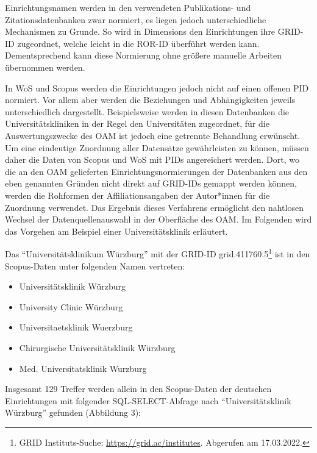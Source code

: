 \documentclass[a4paper,
fontsize=11pt,
oneside,
numbers=noperiodatend,
parskip=half-,
bibliography=totoc,
final
]{scrartcl}
\begin{document}
Einrichtungsnamen werden in den verwendeten Publikations- und
Zitationsdatenbanken zwar normiert, es liegen jedoch unterschiedliche
Mechanismen zu Grunde. So wird in Dimensions den Einrichtungen ihre
GRID-ID zugeordnet, welche leicht in die ROR-ID überführt werden kann.
Dementsprechend kann diese Normierung ohne größere manuelle Arbeiten
übernommen werden.

In WoS und Scopus werden die Einrichtungen jedoch nicht auf einen
offenen PID normiert. Vor allem aber werden die Beziehungen und
Abhängigkeiten jeweils unterschiedlich dargestellt. Beispielsweise
werden in diesen Datenbanken die Universitätskliniken in der Regel den
Universitäten zugeordnet, für die Auswertungszwecke des OAM ist jedoch
eine getrennte Behandlung erwünscht. Um eine eindeutige Zuordnung aller
Datensätze gewährleisten zu können, müssen daher die Daten von Scopus
und WoS mit PIDs angereichert werden. Dort, wo die an den OAM
gelieferten Einrichtungsnormierungen der Datenbanken aus den eben
genannten Gründen nicht direkt auf GRID-IDs gemappt werden können,
werden die Rohformen der Affiliationsangaben der Autor*innen für die
Zuordnung verwendet. Das Ergebnis dieses Verfahrens ermöglicht den
nahtlosen Wechsel der Datenquellenauswahl in der Oberfläche des OAM. Im
Folgenden wird das Vorgehen am Beispiel einer Universitätsklinik
erläutert.

Das \enquote{Universitätsklinikum Würzburg} mit der GRID-ID
grid.411760.5\footnote{GRID Instituts-Suche:
  \url{https://grid.ac/institutes}. Abgerufen am 17.03.2022.} ist in den
Scopus-Daten unter folgenden Namen vertreten:

\begin{itemize}
\item
  Universitätsklinik Würzburg
\item
  University Clinic Würzburg
\item
  Universitaetsklinik Wuerzburg
\item
  Chirurgische Universitätsklinik Würzburg
\item
  Med. Universitatsklinik Wurzburg
\end{itemize}

Insgesamt 129 Treffer werden allein in den Scopus-Daten der deutschen
Einrichtungen mit folgender SQL-SELECT-Abfrage nach
\enquote{Universitätsklinik Würzburg} gefunden (Abbildung 3):
\end{document}
